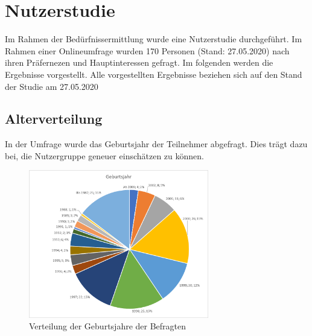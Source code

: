 \section{Nutzerstudie}
Im Rahmen der Bedürfnissermittlung wurde eine Nutzerstudie durchgeführt. Im Rahmen einer Onlineumfrage wurden 170 Personen (Stand: 27.05.2020) nach ihren Präfernezen und Hauptinteressen gefragt. Im folgenden werden die Ergebnisse vorgestellt.
Alle vorgestellten Ergebnisse beziehen sich auf den Stand der Studie am 27.05.2020\\

\subsection{Alterverteilung}
In der Umfrage wurde das Geburtsjahr der Teilnehmer abgefragt. Dies trägt dazu bei, die Nutzergruppe geneuer einschätzen zu können.
\\
\begin{figure}[h]
    \centering
    \includegraphics[width=0.7\textwidth]{media/diagram/geburtsjahr.png}
    \caption{Verteilung der Geburtsjahre der Befragten}
\end{figure}
\\
